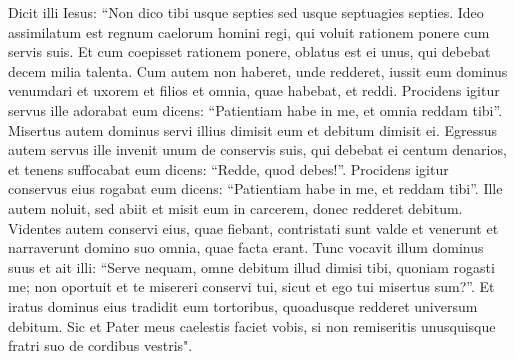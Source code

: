 \begin{biblechapter}
\verse Dicit illi Iesus: “Non dico tibi usque septies sed usque septuagies septies. 
\verse Ideo assimilatum est regnum caelorum homini regi, qui voluit rationem ponere cum servis suis. 
\verse Et cum coepisset rationem ponere, oblatus est ei unus, qui debebat decem milia talenta. 
\verse Cum autem non haberet, unde redderet, iussit eum dominus venumdari et uxorem et filios et omnia, quae habebat, et reddi. 
\verse Procidens igitur servus ille adorabat eum dicens: “Patientiam habe in me, et omnia reddam tibi”. 
\verse Misertus autem dominus servi illius dimisit eum et debitum dimisit ei. 
\verse Egressus autem servus ille invenit unum de conservis suis, qui debebat ei centum denarios, et tenens suffocabat eum dicens: “Redde, quod debes!”. 
\verse Procidens igitur conservus eius rogabat eum dicens: “Patientiam habe in me, et reddam tibi”. 
\verse Ille autem noluit, sed abiit et misit eum in carcerem, donec redderet debitum. 
\verse Videntes autem conservi eius, quae fiebant, contristati sunt valde et venerunt et narraverunt domino suo omnia, quae facta erant. 
\verse Tunc vocavit illum dominus suus et ait illi: “Serve nequam, omne debitum illud dimisi tibi, quoniam rogasti me; 
\verse non oportuit et te misereri conservi tui, sicut et ego tui misertus sum?”. 
\verse Et iratus dominus eius tradidit eum tortoribus, quoadusque redderet universum debitum. 
\verse Sic et Pater meus caelestis faciet vobis, si non remiseritis unusquisque fratri suo de cordibus vestris". 
\end{biblechapter}

